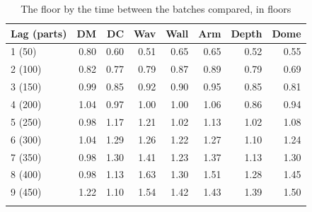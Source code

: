 \documentclass[pdflatex,sn-basic]{sn-jnl}
\newcommand{\tabsize}{\fontsize{8}{9.5}\selectfont}
\begin{document}
\begin{table}[tbp]
\tabsize
\setlength{\tabcolsep}{5pt}
\caption{The floor by the time between the batches compared, in floors}\label{tab:lags}
\begin{tabular}{@{}lrrrrrrr@{}}
\toprule
Lag (parts) & DM & DC & Wav & Wall & Arm & Depth & Dome \\
\midrule
1 (50) & 0.80 & 0.60 & 0.51 & 0.65 & 0.65 & 0.52 & 0.55 \\
2 (100) & 0.82 & 0.77 & 0.79 & 0.87 & 0.89 & 0.79 & 0.69 \\
3 (150) & 0.99 & 0.85 & 0.92 & 0.90 & 0.95 & 0.85 & 0.81 \\
4 (200) & 1.04 & 0.97 & 1.00 & 1.00 & 1.06 & 0.86 & 0.94 \\
5 (250) & 0.98 & 1.17 & 1.21 & 1.02 & 1.13 & 1.02 & 1.08 \\
6 (300) & 1.04 & 1.29 & 1.26 & 1.22 & 1.27 & 1.10 & 1.24 \\
7 (350) & 0.98 & 1.30 & 1.41 & 1.23 & 1.37 & 1.13 & 1.30 \\
8 (400) & 0.98 & 1.13 & 1.63 & 1.30 & 1.51 & 1.28 & 1.45 \\
9 (450) & 1.22 & 1.10 & 1.54 & 1.42 & 1.43 & 1.39 & 1.50 \\
\botrule
\end{tabular}
\end{table}
\end{document}
